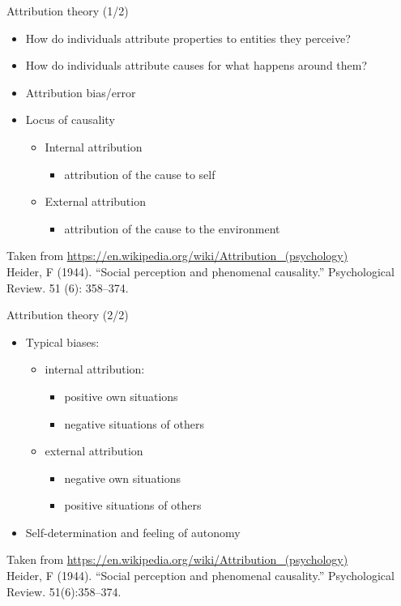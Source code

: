 \documentclass{beamer}
\begin{document}
\begin{frame}
{\centerline{Attribution theory (1/2)}}
\begin{itemize}
    \item How do individuals attribute properties to entities they perceive?
    \item How do individuals attribute causes for what happens around them?
    \item Attribution bias/error
    \item Locus of causality
    \begin{itemize}
    \item Internal attribution
    \begin{itemize}
    \item attribution of the cause to self
    \end{itemize}
    \item External attribution
    \begin{itemize}
    \item attribution of the cause to the environment
    \end{itemize}
    \end{itemize} 
\end{itemize} 

\begin{center}
    \tiny{Taken from \url{https://en.wikipedia.org/wiki/Attribution_(psychology)}\\
    Heider, F (1944). ``Social perception and phenomenal causality.'' Psychological Review. 51 (6): 358–374.}
\end{center}
\end{frame}

\begin{frame}
{\centerline{Attribution theory (2/2)}}
\begin{itemize}
    \item Typical biases:
    \begin{itemize}
    \item internal attribution:
    \begin{itemize}
        \item positive own situations 
        \item negative situations of others
    \end{itemize} 
    \item external attribution
    \begin{itemize}
        \item negative own situations 
        \item positive situations of others
    \end{itemize} 
    \end{itemize} 
    \item Self-determination and feeling of autonomy
\end{itemize} 

\begin{center}
    \tiny{Taken from \url{https://en.wikipedia.org/wiki/Attribution_(psychology)}\\
    Heider, F (1944). ``Social perception and phenomenal causality.'' Psychological Review. 51(6):358–374.}
\end{center}
\end{frame}
\end{document}
